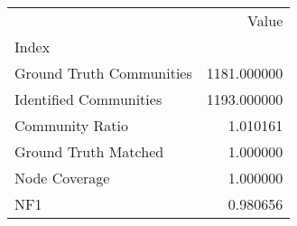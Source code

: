 \begin{tabular}{lr}
\toprule
{} &        Value \\
Index                    &              \\
\midrule
Ground Truth Communities &  1181.000000 \\
Identified Communities   &  1193.000000 \\
Community Ratio          &     1.010161 \\
Ground Truth Matched     &     1.000000 \\
Node Coverage            &     1.000000 \\
NF1                      &     0.980656 \\
\bottomrule
\end{tabular}
